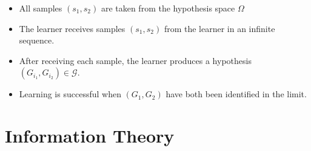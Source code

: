 \documentclass[10pt,\jkfside,a4paper]{article}
\begin{document}
\begin{enumerate}
\begin{itemize}
\item All samples $(s_1, s_2)$ are taken from the hypothesis space $\Omega$

\item The learner receives samples $(s_1, s_2)$ from the learner in an
infinite sequence.

\item After receiving each sample, the learner produces a hypothesis
$(G_{i_1}, G_{i_2}) \in \mathcal G$.

\item Learning is successful when $(G_1, G_2)$ have both been identified in
the limit.

\end{itemize}

\end{enumerate}

\section{Information Theory}
\end{document}
